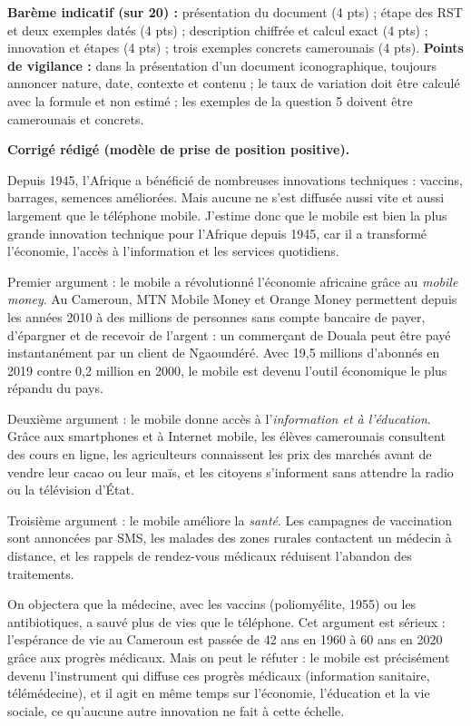 \documentclass[11pt]{article}
\begin{document}
\begin{corrige}
\begin{enumerate}
\begin{itemize}
\end{itemize}
\end{enumerate}
\textbf{Barème indicatif (sur 20) :} présentation du document (4 pts) ; étape des RST et deux exemples datés (4 pts) ; description chiffrée et calcul exact (4 pts) ; innovation et étapes (4 pts) ; trois exemples concrets camerounais (4 pts).
\textbf{Points de vigilance :} dans la présentation d'un document iconographique, toujours annoncer nature, date, contexte et contenu ; le taux de variation doit être calculé avec la formule et non estimé ; les exemples de la question 5 doivent être camerounais et concrets.
\end{corrige}

\begin{corrige}
\textbf{Corrigé rédigé (modèle de prise de position positive).}

Depuis 1945, l'Afrique a bénéficié de nombreuses innovations techniques : vaccins, barrages, semences améliorées. Mais aucune ne s'est diffusée aussi vite et aussi largement que le téléphone mobile. J'estime donc que le mobile est bien la plus grande innovation technique pour l'Afrique depuis 1945, car il a transformé l'économie, l'accès à l'information et les services quotidiens.

Premier argument : le mobile a révolutionné l'économie africaine grâce au \emph{mobile money}. Au Cameroun, MTN Mobile Money et Orange Money permettent depuis les années 2010 à des millions de personnes sans compte bancaire de payer, d'épargner et de recevoir de l'argent : un commerçant de Douala peut être payé instantanément par un client de Ngaoundéré. Avec 19,5 millions d'abonnés en 2019 contre 0,2 million en 2000, le mobile est devenu l'outil économique le plus répandu du pays.

Deuxième argument : le mobile donne accès à l'\emph{information et à l'éducation}. Grâce aux smartphones et à Internet mobile, les élèves camerounais consultent des cours en ligne, les agriculteurs connaissent les prix des marchés avant de vendre leur cacao ou leur maïs, et les citoyens s'informent sans attendre la radio ou la télévision d'État.

Troisième argument : le mobile améliore la \emph{santé}. Les campagnes de vaccination sont annoncées par SMS, les malades des zones rurales contactent un médecin à distance, et les rappels de rendez-vous médicaux réduisent l'abandon des traitements.

On objectera que la médecine, avec les vaccins (poliomyélite, 1955) ou les antibiotiques, a sauvé plus de vies que le téléphone. Cet argument est sérieux : l'espérance de vie au Cameroun est passée de 42 ans en 1960 à 60 ans en 2020 grâce aux progrès médicaux. Mais on peut le réfuter : le mobile est précisément devenu l'instrument qui diffuse ces progrès médicaux (information sanitaire, télémédecine), et il agit en même temps sur l'économie, l'éducation et la vie sociale, ce qu'aucune autre innovation ne fait à cette échelle.


\end{corrige}
\end{document}

